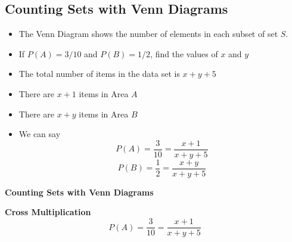 	\subsection{Counting Sets with Venn Diagrams}
	
	\begin{itemize}
		\item The Venn Diagram shows the number of elements in each subset of set $S$.
		\item If $P(A) = 3/10$ and $P(B) = 1/2$, find the values of $x$ and $y$
	\end{itemize}
	
	
	\begin{itemize}
		\item The total number of items in the data set is $x+y+5$
		\item There are $x+1$ items in Area $A$
		\item There are $x+y$ items in Area $B$
		\item We can say
		\[ P(A) = \frac{3}{10} = \frac{x+1}{x+y+5}\]
		\[ P(B) = \frac{1}{2} = \frac{x+y}{x+y+5} \]
	\end{itemize}
	
	\textbf{Counting Sets with Venn Diagrams}
	
	\textbf{Cross Multiplication}
	\[ P(A) = \frac{3}{10} = \frac{x+1}{x+y+5}\]
	
